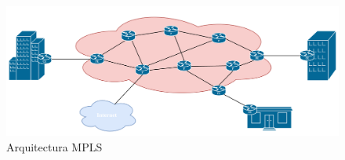 \begin{figure}[htb]
  \centering
  \includegraphics[width=1\textwidth]{images/Arquitectura_MPLS.png}
  \caption{Arquitectura MPLS}
  \label{fig:arquitectura_mpls}
\end{figure}


%


